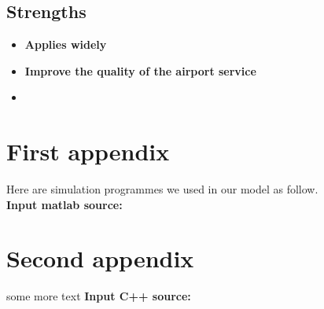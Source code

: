 \documentclass{mcmthesis}
\begin{document}
\subsection{Strengths}
\begin{itemize}
\item \textbf{Applies widely}\\

\item \textbf{Improve the quality of the airport service}\\

\item \textbf{}\\
\end{itemize}


\begin{appendices}

\section{First appendix}


Here are simulation programmes we used in our model as follow.\\

\textbf{\textcolor[rgb]{0.98,0.00,0.00}{Input matlab source:}}


\section{Second appendix}

some more text \textcolor[rgb]{0.98,0.00,0.00}{\textbf{Input C++ source:}}


\end{appendices}

	\nocite{*}



	
\end{document}

